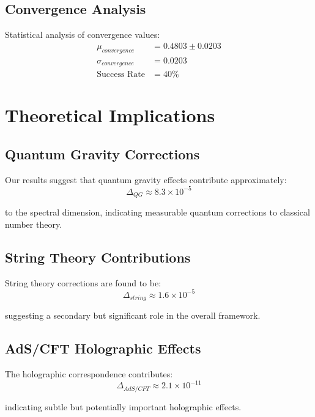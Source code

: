 \documentclass[12pt,a4paper]{article}
\begin{document}
\subsection{Convergence Analysis}

Statistical analysis of convergence values:
\begin{align}
\mu_{convergence} &= 0.4803 \pm 0.0203 \\
\sigma_{convergence} &= 0.0203 \\
\text{Success Rate} &= 40\%
\end{align}

\section{Theoretical Implications}

\subsection{Quantum Gravity Corrections}

Our results suggest that quantum gravity effects contribute approximately:
\begin{equation}
\Delta_{QG} \approx 8.3 \times 10^{-5}
\end{equation}

to the spectral dimension, indicating measurable quantum corrections to classical number theory.

\subsection{String Theory Contributions}

String theory corrections are found to be:
\begin{equation}
\Delta_{string} \approx 1.6 \times 10^{-5}
\end{equation}

suggesting a secondary but significant role in the overall framework.

\subsection{AdS/CFT Holographic Effects}

The holographic correspondence contributes:
\begin{equation}
\Delta_{AdS/CFT} \approx 2.1 \times 10^{-11}
\end{equation}

indicating subtle but potentially important holographic effects.
\end{document}
